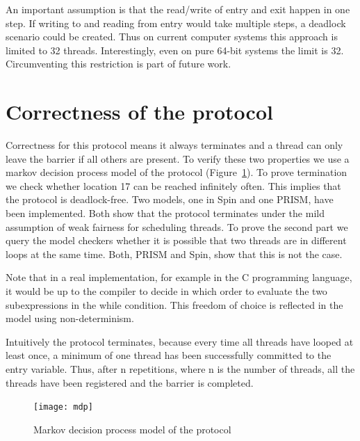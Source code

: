 \documentclass[a4paper, 10pt]{article}
\begin{document}
An important assumption is that the read/write of entry and exit happen in one step. If writing to and reading from entry would take multiple steps, a deadlock scenario could be created. Thus on current computer systems this approach is limited to 32 threads. Interestingly, even on pure 64-bit systems the limit is 32. Circumventing this restriction is part of future work.

\section{Correctness of the protocol}
\label{sec:correctness}
Correctness for this protocol means it always terminates and a thread can only leave the barrier if all others are present. To verify these two properties we use a markov decision process model of the protocol (Figure~\ref{fig:mdp}). To prove termination we check whether location 17 can be reached infinitely often. This implies that the protocol is deadlock-free. Two models, one in Spin\cite{spin} and one PRISM\cite{prism}, have been implemented. Both show that the protocol terminates under the mild assumption of weak fairness for scheduling threads. To prove the second part we query the model checkers whether it is possible that two threads are in different loops at the same time. Both, PRISM and Spin, show that this is not the case.

Note that in a real implementation, for example in the C programming language, it would be up to the compiler to decide in which order to evaluate the two subexpressions in the while condition. This freedom of choice is reflected in the model using non-determinism.

Intuitively the protocol terminates, because every time all threads have looped at least once, a minimum of one thread has been successfully committed to the entry variable. Thus, after n repetitions, where n is the number of threads, all the threads have been registered and the barrier is completed.

\begin{figure}[htbp]
	\centering
	\texttt{[image: mdp]}
	\caption{Markov decision process model of the protocol}
	\label{fig:mdp}
\end{figure}

\clearpage

\end{document}
